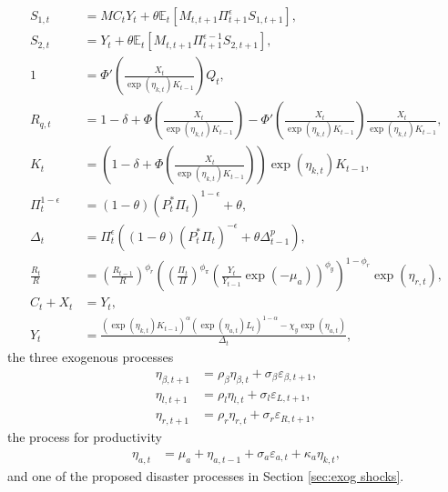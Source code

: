 \documentclass[12 pt, oneside]{article}
\theoremstyle{definition}
\theoremstyle{definition}
\theoremstyle{definition}
\newcommand{\E}{\mathbb{E}}
\begin{document}
\begin{align}
  S_{1, t} & = MC_t Y_t + \theta\E_t[M_{t, t + 1} \Pi_{t + 1}^\epsilon S_{1, t + 1}],\\
  \label{eq:denominator recursion eqm}
  S_{2, t} & =  Y_t + \theta\E_t[M_{t, t + 1} \Pi_{t + 1}^{\epsilon - 1} S_{2, t + 1}],\\
  \label{eq:tobins q eqm}
  1 & = \Phi'\left(\frac{X_t}{\exp(\eta_{k, t})K_{t - 1}}\right) Q_t,\\
  \label{eq:Rq defn eqm}
  R_{q, t} & = 1 - \delta + \Phi\left(\frac{X_t}{\exp(\eta_{k, t})K_{t - 1}}\right) - \Phi'\left(\frac{X_t}{\exp(\eta_{k, t})K_{t - 1}}\right)\frac{X_t}{\exp(\eta_{k, t})K_{t - 1}},\\
  \label{eq:law of motion capital eqm}
  K_t & = \left(1 - \delta + \Phi\left(\frac{X_t}{\exp(\eta_{k, t})K_{t - 1}}\right)\right)\exp(\eta_{k, t})K_{t - 1},\\
  \label{eq:inflation from optimal reset price eqm}
  \Pi_t^{ 1 - \epsilon} & = (1 - \theta) (P_t^*\Pi_t)^{1 - \epsilon} + \theta,\\
  \label{eq:price dispersion evol eqm}
  \Delta_t & = \Pi_t^{\epsilon}((1 - \theta) (P_t^* \Pi_t)^{-\epsilon} + \theta \Delta_{t - 1}^p),\\
  \label{eq:taylor rule eqm}
  \frac{R_t}{R} & =  \left(\frac{R_{t - 1}}{R}\right)^{\phi_r}\left(\left(\frac{\Pi_t}{\Pi}\right)^{\phi_\pi}\left(\frac{Y_t}{Y_{t - 1}}\exp(-\mu_a)\right)^{\phi_y}\right)^{1 - \phi_r}\exp(\eta_{r, t}),\\
  \label{eq:output market clearing eqm}
  C_t + X_t & = Y_t,\\
  \label{eq:aggregate supply eqm}
  Y_t & = \frac{(\exp(\eta_{k, t}) K_{t - 1})^{\alpha}(\exp(\eta_{a, t})L_t)^{1 - \alpha} - \chi_y \exp(\eta_{a, t})}{\Delta_t},
\end{align}
the three exogenous processes
\begin{align}
  \label{eq:ar1 beta}
  \eta_{\beta, t + 1} & = \rho_\beta\eta_{\beta, t} + \sigma_\beta \varepsilon_{\beta, t + 1},\\
  \eta_{l, t + 1} & = \rho_l\eta_{l, t} + \sigma_l \varepsilon_{L, t + 1},\\
  \label{eq:ar1 R}
  \eta_{r, t + 1} & = \rho_r\eta_{r, t} + \sigma_r \varepsilon_{R, t + 1},
\end{align}
the process for productivity
\begin{align}
  \label{eq:productivity process eqm}
  \eta_{a, t} & = \mu_a + \eta_{a, t - 1} + \sigma_a \varepsilon_{a, t} + \kappa_a\eta_{k, t},
\end{align}
and one of the proposed disaster processes in Section \ref{sec:exog shocks}.
\end{document}
